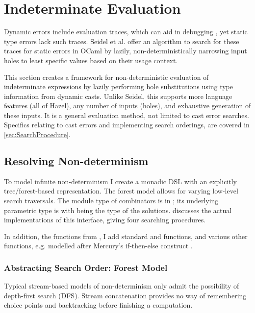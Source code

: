 \section{Indeterminate Evaluation}\label{sec:IndetEval}
Dynamic errors include evaluation traces, which can aid in debugging \cite{TraceVisualisation}, yet static type errors lack such traces. Seidel et al. \cite{SearchProc} offer an algorithm  to search for these traces for static errors in OCaml by lazily, non-deterministically narrowing input holes to least specific values based on their usage context. 

This section creates a framework for non-deterministic evaluation of indeterminate expressions by lazily performing hole substitutions using type information from dynamic casts. Unlike Seidel, this supports more language features (all of Hazel), any number of inputs (holes), and exhaustive generation of these inputs. It is a general evaluation method, not limited to cast error searches. Specifics relating to cast errors and implementing search orderings, are covered in \cref{sec:SearchProcedure}.

\subsection{Resolving Non-determinism}
\label{sec:ResolvingNondeterminism}
To model infinite non-determinism I create a monadic DSL with an explicitly tree/forest-based representation. The forest model allows for varying low-level search traversals. The module type of combinators is in ; its underlying parametric type is  with  being the type of the solutions.  discusses the actual implementations of this interface, giving four searching procedures.


In addition, the functions from , I add standard  and  functions, and various other functions, e.g.  modelled after Mercury's if-then-else construct \cite{Mercury}.

\subsubsection{Abstracting Search Order: Forest Model}
Typical stream-based models of non-determinism \cite{ListOfSuccess} only admit the possibility of depth-first search (DFS). Stream concatenation provides no way of remembering choice points and backtracking before finishing a computation. 

